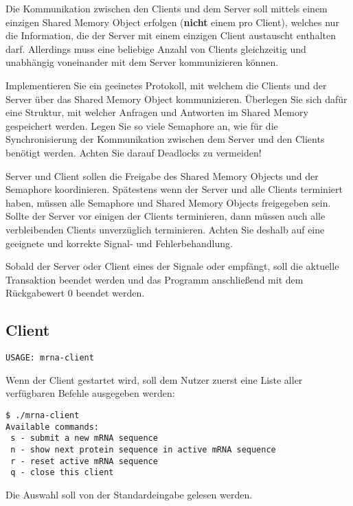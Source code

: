 Die Kommunikation zwischen den Clients und dem Server soll mittels einem
einzigen Shared Memory Object erfolgen (\textbf{nicht} einem pro Client),
welches nur die Information, die der Server mit einem einzigen Client
austauscht enthalten darf.  Allerdings muss eine beliebige Anzahl von Clients
gleichzeitig und unabhängig voneinander mit dem Server kommunizieren können.

Implementieren Sie ein geeinetes Protokoll, mit welchem die Clients und der
Server über das Shared Memory Object kommunizieren. Überlegen Sie sich dafür
eine Struktur, mit welcher Anfragen und Antworten im Shared Memory gespeichert
werden. Legen Sie so viele Semaphore an, wie für die Synchronisierung der
Kommunikation zwischen dem Server und den Clients benötigt werden. Achten Sie
darauf Deadlocks zu vermeiden!

Server und Client sollen die Freigabe des Shared Memory Objects und der
Semaphore koordinieren. Spätestens wenn der Server und alle Clients terminiert
haben, müssen alle Semaphore und Shared Memory Objects freigegeben sein.
Sollte der Server vor einigen der Clients terminieren, dann müssen auch alle
verbleibenden Clients unverzüglich terminieren. Achten Sie deshalb auf eine
geeignete und korrekte Signal- und Fehlerbehandlung.

Sobald der Server oder Client eines der Signale  oder
 empfängt, soll die aktuelle Transaktion beendet werden und
das Programm anschließend mit dem Rückgabewert 0 beendet werden.


\subsection*{Client}

\begin{verbatim}
USAGE: mrna-client
\end{verbatim}

Wenn der Client gestartet wird, soll dem Nutzer zuerst eine Liste aller
verfügbaren Befehle ausgegeben werden:

\begin{verbatim}
$ ./mrna-client
Available commands:
 s - submit a new mRNA sequence
 n - show next protein sequence in active mRNA sequence
 r - reset active mRNA sequence
 q - close this client
\end{verbatim}

Die Auswahl soll von der Standardeingabe gelesen werden.

